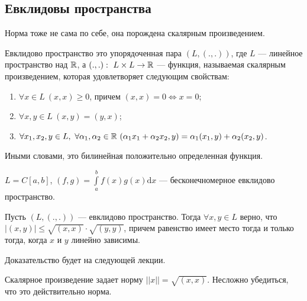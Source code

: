 \subsection*{Евклидовы пространства}
Норма тоже не сама по себе, она порождена скалярным произведением.
\begin{Def}
Евклидово пространство это упорядоченная пара $(L, (., .))$, где $L$ --- линейное пространство над $\mathbb{R}$, а $(., .):\ L\times L \to \mathbb{R}$ --- функция, называемая скалярным произведением, которая удовлетворяет следующим свойствам:
\begin{enumerate}
\item $\forall x \in L\ (x, x) \geq 0$, причем $(x, x) = 0 \Leftrightarrow x = 0$;
\item $\forall x, y\in L\ (x, y) = (y, x)$;
\item $\forall x_1, x_2, y \in L,\ \forall \alpha_1, \alpha_2 \in \mathbb{R}\ (\alpha_1x_1 + \alpha_2x_2, y) = \alpha_1(x_1, y) + \alpha_2(x_2, y)$.
\end{enumerate}
Иными словами, это билинейная положительно определенная функция.
\end{Def}

\begin{Examples}
$L = C[a, b]$, $(f, g) = \int\limits_a^bf(x)g(x)\mathrm{d}x$ --- бесконечномерное евклидово пространство.
\end{Examples}

\begin{Theorem}
Пусть $(L, (., .))$ --- евклидово пространство. Тогда $\forall x, y \in L$ верно, что $|(x, y)| \leq \sqrt{(x, x)}\cdot\sqrt{(y, y)}$, причем равенство имеет место тогда и только тогда, когда $x$ и $y$ линейно зависимы.
\end{Theorem}
Доказательство будет на следующей лекции.

\begin{Statement}
Скалярное произведение задает норму $||x|| = \sqrt{(x, x)}$. Несложно убедиться, что это действительно норма.
\end{Statement}
